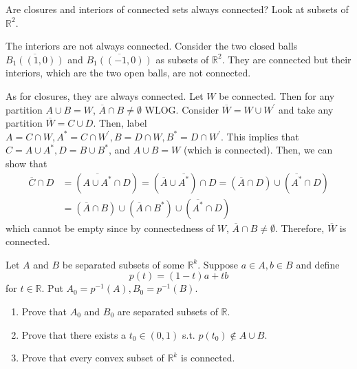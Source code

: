 \documentclass{article}
\begin{document}
    \begin{exercise}[Rudin 2.20]
    Are closures and interiors of connected sets always connected? Look at subsets of $\mathbb{R}^2$. 
    \end{exercise}
    \begin{solution}
    The interiors are not always connected. Consider the two closed balls $\overline{B_1 ((1, 0))}$ and $\overline{B_1 ((-1, 0))}$ as subsets of $\mathbb{R}^2$. They are connected but their interiors, which are the two open balls, are not connected. 

    As for closures, they are always connected. Let $W$ be connected. Then for any partition $A \cup B = W$, $\overline{A} \cap B \neq \emptyset$ WLOG. Consider $\overline{W} = W \cup W^\prime$ and take any partition $\overline{W} = C \cup D$. Then, label $A = C \cap W, A^\ast = C \cap W^\prime, B = D \cap W, B^\ast = D \cap W^\prime$. This implies that $C = A \cup A^\ast, D = B \cup B^\ast$, and $A \cup B = W$ (which is connected). Then, we can show that 
    \begin{align*}
        \overline{C} \cap D & = (\overline{A \cup A^\ast} \cap D) = (\overline{A} \cup \overline{A^\ast}) \cap D = (\overline{A} \cap D) \cup (\overline{A^\ast} \cap D) \\
        & =(\overline{A} \cap B) \cup (\overline{A} \cap B^\ast) \cup (\overline{A^\ast} \cap D)
    \end{align*}
    which cannot be empty since by connectedness of $W$, $\overline{A} \cap B \neq \emptyset$. Therefore, $\overline{W}$ is connected. 
    \end{solution}

    \begin{exercise}[Rudin 2.21]
    Let $A$ and $B$ be separated subsets of some $\mathbb{R}^k$. Suppose $a \in A, b \in B$ and define 
    \[p(t) = (1 - t) a + t b\]
    for $t \in \mathbb{R}$. Put $A_0 = p^{-1} (A), B_0 = p^{-1} (B)$. 
    \begin{enumerate}
        \item Prove that $A_0$ and $B_0$ are separated subsets of $\mathbb{R}$. 
        \item Prove that there exists a $t_0 \in (0, 1)$ s.t. $p(t_0) \not\in A \cup B$. 
        \item Prove that every convex subset of $\mathbb{R}^k$ is connected. 
    \end{enumerate}
    \end{exercise}
\end{document}
